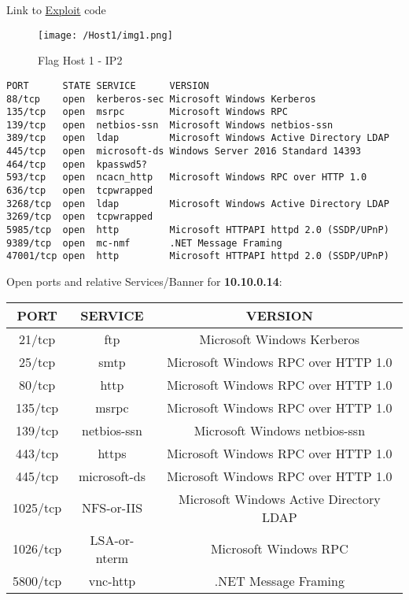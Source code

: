 \documentclass[11pt, a4paper]{article}
\begin{document}
Link to \href{https://www.exploit-db.com/}{Exploit} code

\begin{figure}[h]
    \centering
    \texttt{[image: /Host1/img1.png]}
    \caption{Flag Host 1 - IP2}
\end{figure}

\begin{verbatim}
PORT      STATE SERVICE      VERSION
88/tcp    open  kerberos-sec Microsoft Windows Kerberos 
135/tcp   open  msrpc        Microsoft Windows RPC
139/tcp   open  netbios-ssn  Microsoft Windows netbios-ssn
389/tcp   open  ldap         Microsoft Windows Active Directory LDAP
445/tcp   open  microsoft-ds Windows Server 2016 Standard 14393
464/tcp   open  kpasswd5?
593/tcp   open  ncacn_http   Microsoft Windows RPC over HTTP 1.0
636/tcp   open  tcpwrapped
3268/tcp  open  ldap         Microsoft Windows Active Directory LDAP 
3269/tcp  open  tcpwrapped
5985/tcp  open  http         Microsoft HTTPAPI httpd 2.0 (SSDP/UPnP)
9389/tcp  open  mc-nmf       .NET Message Framing
47001/tcp open  http         Microsoft HTTPAPI httpd 2.0 (SSDP/UPnP)
\end{verbatim}

\newpage

Open ports and relative Services/Banner for \textbf{10.10.0.14}:

\begin{center}
    \begin{tabular}{||c c c||} 
     \hline
     PORT & SERVICE & VERSION\\ [0.5ex] 
     \hline\hline
     21/tcp & ftp & Microsoft Windows Kerberos\\ 
     25/tcp & smtp & Microsoft Windows RPC over HTTP 1.0\\
     80/tcp  & http & Microsoft Windows RPC over HTTP 1.0\\
     135/tcp & msrpc & Microsoft Windows RPC over HTTP 1.0\\
     139/tcp & netbios-ssn & Microsoft Windows netbios-ssn\\
     443/tcp & https & Microsoft Windows RPC over HTTP 1.0\\
     445/tcp & microsoft-ds & Microsoft Windows RPC over HTTP 1.0\\
     1025/tcp & NFS-or-IIS & Microsoft Windows Active Directory LDAP\\
     1026/tcp & LSA-or-nterm & Microsoft Windows RPC\\
     5800/tcp & vnc-http & .NET Message Framing\\[1ex]
     \hline
    \end{tabular}
\end{center}
\end{document}
